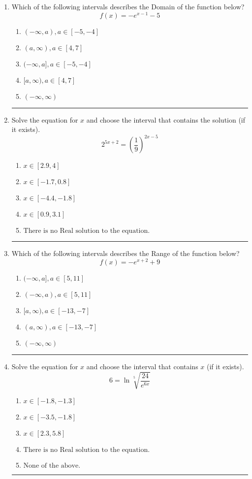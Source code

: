 \documentclass[14pt]{extbook}
\newcommand{\litem}[1]{\item#1\hspace*{-1cm}\rule{\textwidth}{0.4pt}}
\begin{document}
\begin{enumerate}
{\begin{enumerate}[label=\Alph*.]
\end{enumerate} }
\litem{
Which of the following intervals describes the Domain of the function below?\[ f(x) = -e^{x-1}-5 \]\begin{enumerate}[label=\Alph*.]
\item \( (-\infty, a), a \in [-5, -4] \)
\item \( (a, \infty), a \in [4, 7] \)
\item \( (-\infty, a], a \in [-5, -4] \)
\item \( [a, \infty), a \in [4, 7] \)
\item \( (-\infty, \infty) \)

\end{enumerate} }
\litem{
Solve the equation for $x$ and choose the interval that contains the solution (if it exists).\[ 2^{5x+2} = \left(\frac{1}{9}\right)^{2x-5} \]\begin{enumerate}[label=\Alph*.]
\item \( x \in [2.9, 4] \)
\item \( x \in [-1.7, 0.8] \)
\item \( x \in [-4.4, -1.8] \)
\item \( x \in [0.9, 3.1] \)
\item \( \text{There is no Real solution to the equation.} \)

\end{enumerate} }
\litem{
Which of the following intervals describes the Range of the function below?\[ f(x) = -e^{x+2}+9 \]\begin{enumerate}[label=\Alph*.]
\item \( (-\infty, a], a \in [5, 11] \)
\item \( (-\infty, a), a \in [5, 11] \)
\item \( [a, \infty), a \in [-13, -7] \)
\item \( (a, \infty), a \in [-13, -7] \)
\item \( (-\infty, \infty) \)

\end{enumerate} }
\litem{
 Solve the equation for $x$ and choose the interval that contains $x$ (if it exists).\[  6 = \ln{\sqrt[5]{\frac{24}{e^{6x}}}} \]\begin{enumerate}[label=\Alph*.]
\item \( x \in [-1.8, -1.3] \)
\item \( x \in [-3.5, -1.8] \)
\item \( x \in [2.3, 5.8] \)
\item \( \text{There is no Real solution to the equation.} \)
\item \( \text{None of the above.} \)


\end{enumerate}}
\end{enumerate}
\end{document}
